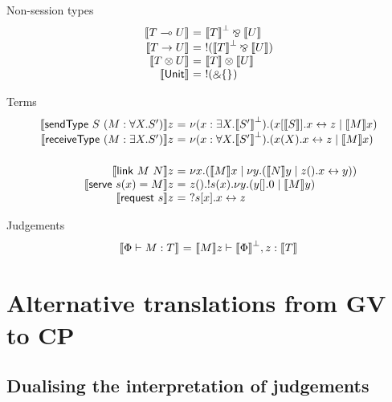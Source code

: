 \documentclass{easychair}
\makeatletter
\newcommand{\ba}{\begin{array}}
\newcommand{\ea}{\end{array}}
\newenvironment{equations}{\[\ba{@{}r@{~}c@{~}l@{}}}{\ea\]}
\newcommand{\key}{\mathsf}
\newcommand{\set}[1]{\{ #1 \}}
\newcommand{\gvtocp}[1]{\llbracket{#1}\rrbracket}
\newcommand{\row}[2]{\set{#1}_{#2}}
\newcommand{\cpj}[2]{{#1} \vdash {#2}}
\newcommand{\gvj}[3]{{#1} \vdash {#2} : {#3}}
\newcommand{\lolli}{\multimap}
\newcommand{\gvLinFun}[2]{{#1} \lolli {#2}}
\newcommand{\gvUnFun}[2]{{#1} \to {#2}}
\newcommand{\gvTimes}[2]{{#1} \otimes {#2}}
\newcommand{\gvUnitType}{\key{Unit}}
\newcommand{\gvLink}[2]{\key{link}~{#1}~{#2}}
\newcommand{\gvSendType}[2]{\key{sendType}~{#1}~{#2}}
\newcommand{\gvReceiveType}[1]{\key{receiveType}~{#1}}
\newcommand{\gvServe}[3]{\key{serve}~{#1}({#2})={#3}}
\newcommand{\gvRequest}[1]{\key{request}~{#1}}
\newcommand{\cpLink}[2]{{#1} \leftrightarrow {#2}}
\newcommand{\cpCut}[3]{\nu {#1}.({#2} \mid {#3})}
\newcommand{\cpServe}[3]{!{#1}({#2}).{#3}}
\newcommand{\cpRequest}[3]{?{#1}[{#2}].{#3}}
\newcommand{\cpEmptyOut}[1]{{#1}[].0}
\newcommand{\cpEmptyIn}[2]{{#1}().{#2}}
\newcommand{\cpSendType}[3]{{#1}[{#2}].{#3}}
\newcommand{\cpReceiveType}[3]{{#1}({#2}).{#3}}
\newcommand{\cpTimes}[2]{{#1} \otimes {#2}}
\newcommand{\cpPar}[2]{{#1} \mathbin{\bindnasrepma} {#2}}
\newcommand{\cpWith}[2]{\binampersand \row{#1}{#2}}
\newcommand{\cpOfCourse}[1]{!{#1}}
\newcommand{\cpDual}[1]{{#1}^\bot}
\newcommand{\cpExists}[2]{\exists {#1}.{#2}}
\newcommand{\cpForall}[2]{\forall {#1}.{#2}}
\makeatother
\begin{document}
Non-session types
\begin{equations}
\gvtocp{\gvLinFun{T}{U}} &=& \cpPar{\cpDual{\gvtocp{T}}}{\gvtocp{U}} \\
\gvtocp{\gvUnFun{T}{U}} &=& \cpOfCourse{(\cpPar{\cpDual{\gvtocp{T}}}{\gvtocp{U}})} \\
\gvtocp{\gvTimes{T}{U}} &=& \cpTimes{\gvtocp{T}}{\gvtocp{U}} \\
\gvtocp{\gvUnitType} &=& \cpOfCourse{(\cpWith{}{})} \\
\end{equations}

Terms
\begin{equations}
\gvtocp{\gvSendType{S}{(M : \cpForall{X}{S'})}}z &=&
  \cpCut{(x:\cpExists{X}{\cpDual{\gvtocp{S'}}})}{\cpSendType{x}{\gvtocp{S}}{\cpLink{x}{z}}}{\gvtocp{M}x} \\
\gvtocp{\gvReceiveType{(M : \cpExists{X}{S'})}}z &=&
  \cpCut{(x:\cpForall{X}{\cpDual{\gvtocp{S'}}})}{\cpReceiveType{x}{X}{\cpLink{x}{z}}}{\gvtocp{M}x} \\
\\[1ex]
\gvtocp{\gvLink{M}{N}}z &=& \cpCut{x}{\gvtocp{M}x}{\cpCut{y}{\gvtocp{N}y}{\cpEmptyIn{z}{\cpLink{x}{y}}}} \\
\gvtocp{\gvServe{s}{x}{M}}z &=&
  \cpEmptyIn{z}
            {\cpServe{s}{x}
                     {\cpCut{y}{\cpEmptyOut{y}}{\gvtocp{M}y}}} \\
\gvtocp{\gvRequest{s}}z &=& \cpRequest{s}{x}{\cpLink{x}{z}} \\
\end{equations}

Judgements
\begin{equations}
\gvtocp{\gvj{\Phi}{M}{T}} &=& \cpj{\gvtocp{M}z}{\cpDual{\gvtocp{\Phi}}, z:\gvtocp{T}}
\end{equations}




  

\section{Alternative translations from GV to CP}

\subsection{Dualising the interpretation of judgements}
\end{document}

